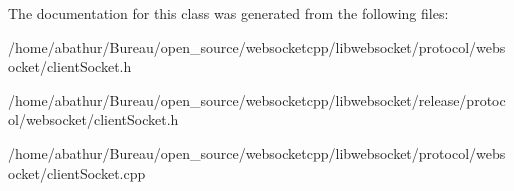 The documentation for this class was generated from the following files\-:\begin{DoxyCompactItemize}
\item 
/home/abathur/\-Bureau/open\-\_\-source/websocketcpp/libwebsocket/protocol/websocket/client\-Socket.\-h\item 
/home/abathur/\-Bureau/open\-\_\-source/websocketcpp/libwebsocket/release/protocol/websocket/client\-Socket.\-h\item 
/home/abathur/\-Bureau/open\-\_\-source/websocketcpp/libwebsocket/protocol/websocket/client\-Socket.\-cpp\end{DoxyCompactItemize}
